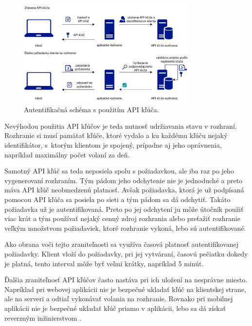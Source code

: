 \begin{figure}
    \centerline{\includegraphics[width=0.8\textwidth]{images/api_key_schema}}
    \caption[Schéma s použitím API kľúča]{Autentifikačná schéma s použitím API kľúča.}
    \label{fig:api_key_schema}
\end{figure}

Nevýhodou použitia API kľúčov je teda nutnosť udržiavania stavu v rozhraní. Rozhranie si musí pamätať kľúče, ktoré vydalo a ku každému kľúču nejaký identifikátor, s~ktorým klientom je spojený, prípadne aj jeho oprávnenia, napríklad maximálny počet volaní za deň.

Samotný API kľúč sa teda neposiela spolu s požiadavkou, ale iba raz po jeho vygenerovaní rozhraním. Tým pádom jeho odchytenie nie je jednoduché a preto máva API kľúč neobmedzenú platnosť. Avšak požiadavka, ktorá je už podpísaná pomocou API kľúča sa posiela po sieti a tým pádom sa dá odchytiť. Takáto požiadavka už je autentifikovaná. Preto po jej odchytení ju môže útočník použiť viac krát a tým používať nejaký cenný zdroj rozhrania alebo preťažiť rozhranie veľkým množstvom požiadaviek, ktoré rozhranie vykoná, lebo sú autentifikované.

Ako obrana voči tejto zraniteľnosti sa využíva časová platnosť autentifikovanej požiadavky. Klient vloží do požiadavky, pri jej vytváraní, časovú pečiatku dokedy je platná, tento interval môže byť veľmi krátky, napríklad 5 minút.

Ďalšia zraniteľnosť API kľúčov často nastáva pri ich uložení na nesprávne miesto. Napríklad pri webovej aplikácii nie je bezpečné ukladať kľúč na klientskej strane, ale na serveri a odtiaľ vykonávať volania na rozhranie. Rovnako pri mobilnej aplikácii nie je bezpečné ukladať kľúč priamo v aplikácii, lebo sa dá získať reverzným inžinierstvom \cite{api_key_vulnerabilities}.



